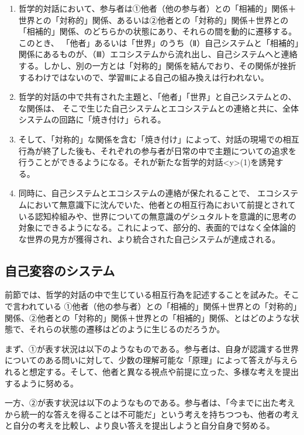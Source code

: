 \documentclass[b5j,twoside,twocolumn]{utarticle}
\begin{document}
\begin{enumerate}
\renewcommand{\labelenumi}{\pbox<y>{(\arabic{enumi})}}
\item 哲学的対話において、参与者は①他者（他の参与者）との「相補的」関係＋世界との「対称的」関係、あるいは②他者との「対称的」関係＋世界との「相補的」関係、のどちらかの状態にあり、それらの間を動的に遷移する。このとき、
「他者」あるいは「世界」のうち（Ⅱ）自己システムと「相補的」関係にあるものが、（Ⅲ）エコシステムから流れ出し、自己システムへと連絡する。しかし、別の一方とは「対称的」関係を結んでおり、その関係が挫折するわけではないので、学習Ⅲによる自己の組み換えは行われない。
\item 哲学的対話の中で共有された主題と、「他者」「世界」と自己システムとの、な関係は、
そこで生じた自己システムとエコシステムとの連絡と共に、全体システムの回路に「焼き付け」られる。
\item そして、「対称的」な関係を含む「焼き付け」によって、対話の現場での相互行為が終了した後も、それぞれの参与者が日常の中で主題についての追求を行うことができるようになる。それが新たな哲学的対話\pbox<y>{(1)}を誘発する。
\item 同時に、自己システムとエコシステムの連絡が保たれることで、
エコシステムにおいて無意識下に沈んでいた、他者との相互行為において前提とされている認知枠組みや、世界についての無意識のゲシュタルトを意識的に思考の対象にできるようになる。これによって、部分的、表面的ではなく全体論的な世界の見方が獲得され、より統合された自己システムが達成される。
\end{enumerate}


\subsection{自己変容のシステム}
前節では、哲学的対話の中で生じている相互行為を記述することを試みた。そこで言われている
①他者（他の参与者）との「相補的」関係＋世界との「対称的」関係、②他者との「対称的」関係＋世界との「相補的」関係、とはどのような状態で、それらの状態の遷移はどのように生じるのだろうか。


まず、①が表す状況は以下のようなものである。参与者は、自身が認識する世界についてのある問いに対して、少数の理解可能な「原理」によって答えが与えられると想定する。そして、他者と異なる視点や前提に立った、多様な考えを提出するように努める。


一方、②が表す状況は以下のようなものである。参与者は、「今までに出た考えから統一的な答えを得ることは不可能だ」という考えを持ちつつも、他者の考えと自分の考えを比較し、より良い答えを提出しようと自分自身で努める。
\end{document}
